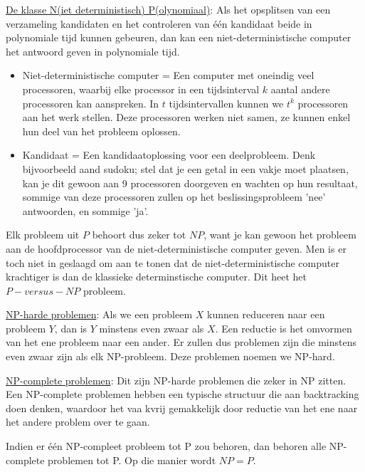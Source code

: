 \documentclass{report}
\begin{document}
\underline{De klasse N(iet deterministisch) P(olynomiaal)}: Als het opsplitsen van een verzameling kandidaten en het controleren van één kandidaat beide in polynomiale tijd kunnen gebeuren, dan kan een niet-deterministische computer het antwoord geven in polynomiale tijd.
\begin{itemize}
	\item Niet-deterministische computer = Een computer met oneindig veel processoren, waarbij elke processor in een tijdsinterval $k$ aantal andere processoren kan aanspreken. In $t$ tijdsintervallen kunnen we $t^k$ processoren aan het werk stellen. Deze processoren werken niet samen, ze kunnen enkel hun deel van het probleem oplossen.
	\item Kandidaat = Een kandidaatoplossing voor een deelprobleem. Denk bijvoorbeeld aand sudoku; stel dat je een getal in een vakje moet plaatsen, kan je dit gewoon aan 9 processoren doorgeven en wachten op hun resultaat, sommige van deze processoren zullen op het beslissingsprobleem 'nee' antwoorden, en sommige 'ja'.
\end{itemize}

Elk probleem uit $P$ behoort dus zeker tot $NP$, want je kan gewoon het probleem aan de hoofdprocessor van de niet-deterministische computer geven. Men is er toch niet in geslaagd om aan te tonen dat de niet-deterministische computer krachtiger is dan de klassieke determinstische computer. Dit heet het $P-versus-NP$ probleem.

\underline{NP-harde problemen}: Als we een probleem $X$ kunnen reduceren naar een probleem $Y$, dan is $Y$ minstens even zwaar als $X$. Een reductie is het omvormen van het ene probleem naar een ander. Er zullen dus problemen zijn die minstens even zwaar zijn als elk NP-probleem. Deze problemen noemen we NP-hard.

\underline{NP-complete problemen}: Dit zijn NP-harde problemen die zeker in NP zitten. Een NP-complete problemen hebben een typische structuur die aan backtracking doen denken, waardoor het vaa kvrij gemakkelijk door reductie van het ene naar het andere problem over te gaan.

Indien er één NP-compleet probleem tot P zou behoren, dan behoren alle NP-complete problemen tot P. Op die manier wordt $NP = P$.
\end{document}
